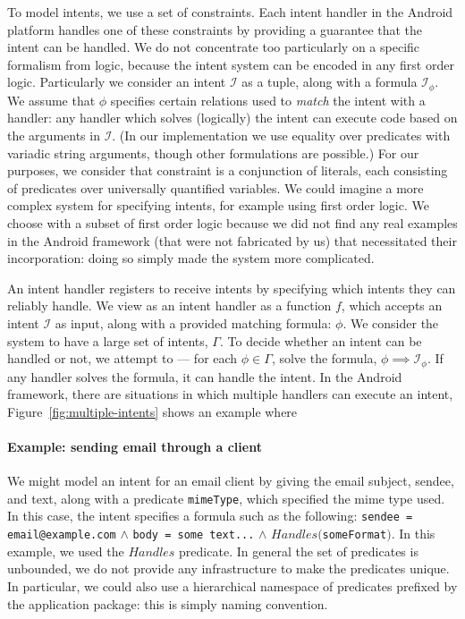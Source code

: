 \documentclass{acm_proc_article-sp}
\begin{document}
To model intents, we use a set of constraints.  Each intent handler in
the Android platform handles one of these constraints by providing a
guarantee that the intent can be handled.  We do not concentrate too
particularly on a specific formalism from logic, because the intent
system can be encoded in any first order logic.  Particularly we
consider an intent $\mathcal{I}$ as a tuple, along with a formula
$\mathcal{I}_\phi$.  We assume that $\phi$ specifies certain relations
used to \emph{match} the intent with a handler: any handler which
solves (logically) the intent can execute code based on the arguments
in $\mathcal{I}$.  (In our implementation we use equality over
predicates with variadic string arguments, though other formulations
are possible.)  For our purposes, we consider that constraint is a
conjunction of literals, each consisting of predicates over
universally quantified variables.  We could imagine a more complex
system for specifying intents, for example using first order logic.
We choose with a subset of first order logic because we did not find
any real examples in the Android framework (that were not fabricated
by us) that necessitated their incorporation: doing so simply made the
system more complicated.

An intent handler registers to receive intents by specifying which
intents they can reliably handle.  We view as an intent handler as a
function $f$, which accepts an intent $\mathcal{I}$ as input, along
with a provided matching formula: $\phi$.  We consider the system to
have a large set of intents, $\Gamma$.  To decide whether an intent
can be handled or not, we attempt to --- for each $\phi \in \Gamma$,
solve the formula, $\phi \implies \mathcal{I}_\phi$.  If any handler
solves the formula, it can handle the intent.  In the Android
framework, there are situations in which multiple handlers can execute
an intent, Figure~\ref{fig:multiple-intents} shows an example where

\paragraph*{Example: sending email through a client} 
We might model an intent for an email client by giving the email
subject, sendee, and text, along with a predicate \texttt{mimeType},
which specified the mime type used.  In this case, the intent
specifies a formula such as the following: \texttt{sendee =
  email@example.com} $\land$ \texttt{body = some text...} $\land$
$Handles($\texttt{someFormat}$)$.  In this example, we used the
$Handles$ predicate.  In general the set of predicates is unbounded,
we do not provide any infrastructure to make the predicates unique.
In particular, we could also use a hierarchical namespace of
predicates prefixed by the application package: this is simply naming
convention.
\end{document}
